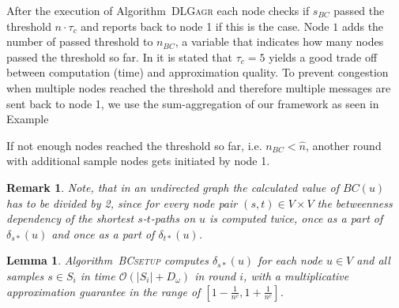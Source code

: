\documentclass[11pt]{article}
\newcommand{\BO}{\mathcal{O}}
\newtheorem{lemma}[theorem]{Lemma}
\newtheorem{remark}[theorem]{Remark}
\newcommand{\calL}{\mathcal{L}}
\newif\iffull
\newif\ifshort
\begin{document}
\iffull
\begin{algorithm}[htb]
\begin{algorithmic}[1]
\STATE \COMMENT{INITIALIZATION} 
\STATE \textbf{global} $\delta_{BC}:=\{0,\dots,0\}$; \COMMENT{$\delta_{BC}[s]$ := dependency of the source vertex s on u.} \newline

\STATE \COMMENT{COMPUTATION, $g(v, msg_c)$: $v$ root node ID of the message, $msg_c$ message of a child in $\calL_v$}
\STATE $(\delta_c, tsp_c):=msg_c$;
\STATE $\delta:=(total_{sp}[v_i]/tsp_c)\cdot(1+\delta_c)$;\label{line:dep1bc}
\STATE $\delta_{BC}[v_i]:=\delta_{BC}[v_i]+\delta$;\label{line:depbc}
\STATE $s_{BC} := s_{BC}+\delta$; \label{line:sumsbc}
\STATE $msg_p[v]=(\delta_{BC}[v], total_{sp}[v])$; \COMMENT{output}
\end{algorithmic}
\caption{$\mathcal{A}_{BC}'()$}
\label{alg:BC_g}
\vspace*{0.5cm}
\end{algorithm}
\fi

After the execution of Algorithm\iffull~\ref{alg:DLGagr}\fi~\textsc{DLGagr} each node checks \iffull in Line \ref{line:BCcheck}\fi if $s_{BC}$ passed the threshold $n\cdot \tau_c$ and reports back to node 1 if this is the case. Node $1$ adds the number of passed threshold to $n_{BC}$, a variable that indicates how many nodes passed the threshold so far. In \cite{bader:2007:BCapprox} it is stated that $\tau_c=5$ yields a good trade off between computation (time) and approximation quality. To prevent congestion when multiple nodes reached the threshold and therefore multiple messages are sent back to node 1, we use the sum-aggregation of our framework as seen in Example
\ifshort
 \ref{FULL:ex:sumval}.
\fi
\iffull
 \ref{ex:sumval}.
\fi

If not enough nodes reached the threshold so far, i.e. $n_{BC}<\hat{n}$, another round with additional sample nodes gets initiated by node 1.

\begin{remark}
Note, that in an undirected graph the calculated value of $BC(u)$ has to be divided by 2, since for every node pair $(s,t)\in V\times V$ the betweenness dependency of the shortest $s$-$t$-paths on $u$ is computed twice, once as a part of $\delta_{s*}(u)$ and once as a part of $\delta_{t*}(u)$.
\end{remark}


\begin{lemma}
Algorithm\iffull~\ref{alg:BC_setup_controlling}\fi~\textsc{BCsetup} computes $\delta_{s*}(u)$ for each node $u\in V$ and all samples $s\in S_i$ in time $\BO(|S_i|+D_\omega)$ in round $i$, with a multiplicative approximation guarantee in the range of $[1-\frac{1}{n^c},1+\frac{1}{n^c}]$. 
\label{lemma:deproundapprox}
\end{lemma}
\ifshort
This is a key-lemma within the proof of Theorem \ref{theo:bcapprox} and we state the full proof in Appendix~\ref{sec:algBC}.
\fi
\end{document}

